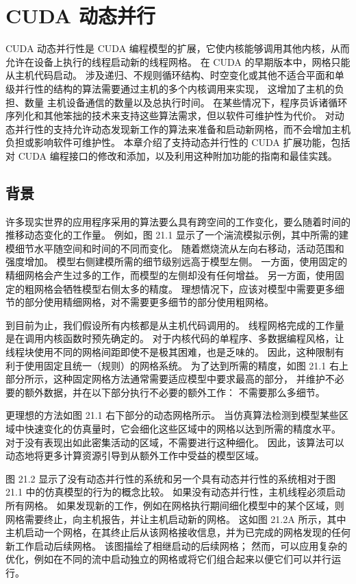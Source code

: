\section{CUDA 动态并行}
CUDA 动态并行性是 CUDA 编程模型的扩展，它使内核能够调用其他内核，从而允许在设备上执行的线程启动新的线程网格。 
在 CUDA 的早期版本中，网格只能从主机代码启动。 
涉及递归、不规则循环结构、时空变化或其他不适合平面和单级并行性的结构的算法需要通过主机的多个内核调用来实现，
这增加了主机的负担、数量 主机设备通信的数量以及总执行时间。 
在某些情况下，程序员诉诸循环序列化和其他笨拙的技术来支持这些算法需求，但以软件可维护性为代价。 
对动态并行性的支持允许动态发现新工作的算法来准备和启动新网格，而不会增加主机负担或影响软件可维护性。 
本章介绍了支持动态并行性的 CUDA 扩展功能，包括对 CUDA 编程接口的修改和添加，以及利用这种附加功能的指南和最佳实践。

\subsection{背景}
许多现实世界的应用程序采用的算法要么具有跨空间的工作变化，要么随着时间的推移动态变化的工作量。 
例如，图 21.1 显示了一个湍流模拟示例，其中所需的建模细节水平随空间和时间的不同而变化。 
随着燃烧流从左向右移动，活动范围和强度增加。 模型右侧建模所需的细节级别远高于模型左侧。 
一方面，使用固定的精细网格会产生过多的工作，而模型的左侧却没有任何增益。 
另一方面，使用固定的粗网格会牺牲模型右侧太多的精度。 
理想情况下，应该对模型中需要更多细节的部分使用精细网格，对不需要更多细节的部分使用粗网格。

到目前为止，我们假设所有内核都是从主机代码调用的。 线程网格完成的工作量是在调用内核函数时预先确定的。 
对于内核代码的单程序、多数据编程风格，让线程块使用不同的网格间距即使不是极其困难，也是乏味的。 
因此，这种限制有利于使用固定且统一（规则）的网格系统。 
为了达到所需的精度，如图 21.1 右上部分所示，这种固定网格方法通常需要适应模型中要求最高的部分，
并维护不必要的额外数据，并在以下部分执行不必要的额外工作： 不需要那么多细节。

更理想的方法如图 21.1 右下部分的动态网格所示。 
当仿真算法检测到模型某些区域中快速变化的仿真量时，它会细化这些区域中的网格以达到所需的精度水平。 
对于没有表现出如此密集活动的区域，不需要进行这种细化。 
因此，该算法可以动态地将更多计算资源引导到从额外工作中受益的模型区域。

图 21.2 显示了没有动态并行性的系统和另一个具有动态并行性的系统相对于图 21.1 中的仿真模型的行为的概念比较。 
如果没有动态并行性，主机线程必须启动所有网格。 
如果发现新的工作，例如在网格执行期间细化模型中的某个区域，则网格需要终止，向主机报告，并让主机启动新的网格。 
这如图 21.2A 所示，其中主机启动一个网格，在其终止后从该网格接收信息，并为已完成的网格发现的任何新工作启动后续网格。 
该图描绘了相继启动的后续网格； 然而，可以应用复杂的优化，例如在不同的流中启动独立的网格或将它们组合起来以便它们可以并行运行。

